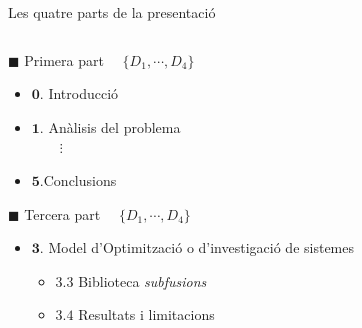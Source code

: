 \documentclass[twocolumn]{beamer}
\begin{document}
\begin{frame}{Les quatre parts de la presentació}
\begin{columns}[t]
\begin{column}{.5\textwidth}
       \begin{block}{$\blacksquare$ Primera part $\quad\{  D_1,\cdots,D_4\}$}
       	\begin{itemize}
       		\small
       		\item $\mathbf{0.}$ Introducció
       		\item $\mathbf{1.}$ Anàlisis del problema \\ $\quad \quad \vdots$
       		\item $\mathbf{5.}$Conclusions
       	\end{itemize}
       \normalsize
       \end{block}
  \begin{block}{$\blacksquare$ Tercera part $\quad\{  D_1,\cdots,D_4\}$}
  	\begin{itemize}
  		\small
  		\item $\mathbf{3.}$ Model d’Optimització o d’investigació de sistemes
  		\begin{itemize}
  			\footnotesize
  			\item $\mathbf{3.3}$ Biblioteca \textit{subfusions}
  			\item $\mathbf{3.4}$ Resultats i limitacions 
  		\end{itemize}
  	\end{itemize}
  \end{block}
\end{column}
\begin{column}{.5\textwidth}


\end{column}
\end{columns}
\end{frame}
\end{document}
